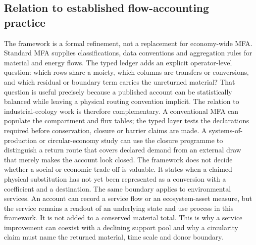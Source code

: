 \documentclass[11pt]{article}
\begin{document}
\subsection{Relation to established flow-accounting practice}
The framework is a formal refinement, not a replacement for economy-wide MFA. Standard MFA supplies classifications, data conventions and aggregation rules for material and energy flows. The typed ledger adds an explicit operator-level question: which rows share a moiety, which columns are transfers or conversions, and which residual or boundary term carries the unreturned material? That question is useful precisely because a published account can be statistically balanced while leaving a physical routing convention implicit.
The relation to industrial-ecology work is therefore complementary. A conventional MFA can populate the compartment and flux tables; the typed layer tests the declarations required before conservation, closure or barrier claims are made. A systems-of-production or circular-economy study can use the closure programme to distinguish a return route that covers declared demand from an external draw that merely makes the account look closed. The framework does not decide whether a social or economic trade-off is valuable. It states when a claimed physical substitution has not yet been represented as a conversion with a coefficient and a destination.
The same boundary applies to environmental services. An account can record a service flow or an ecosystem-asset measure, but the service remains a readout of an underlying state and use process in this framework. It is not added to a conserved material total. This is why a service improvement can coexist with a declining support pool and why a circularity claim must name the returned material, time scale and donor boundary.
\end{document}
